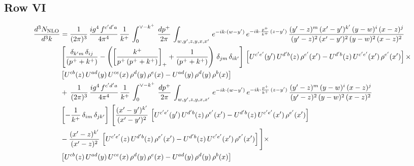 \documentclass[9pt]{article}
\numberwithin{equation}{section}
\begin{document}
\subsection{Row VI}
\begin{align}
   \frac{d^{3}N_{\rm NLO}}{d^{3}k} & = \frac{1}{(2\pi)^{3}}\, \frac{ig^{4}\,f^{c'd'a}}{4\pi^{4}}\, \frac{1}{k^{+}}\,\int_{0}^{\vee - k^{+}}\, \frac{dp^{+}}{2\pi}\, \int_{w,y',z,y,x,x'}\, e^{-ik\cdot (w-y')}\, e^{-ik\cdot \frac{p^{+}}{k^{+}}\,(z-y')}\,\frac{(y'-z)^{m}\,(x'-y')^{k'}\,(y-w)^{i}\,(x-z)^{j}}{(y'-z)^{2}\,(x'-y')^{2}\,(y-w)^{2}\,(x-z)^{2}}\notag \\ & \left[\frac{\delta_{k'm}\,\delta_{ij}}{(p^{+}+k^{+})}-\left(\left[\frac{k^{+}}{p^{+}\,(p^{+}+k^{+})}\right]_{+}+\frac{1}{(p^{+}+k^{+})}\right)\,\delta_{jm}\,\delta_{ik'}\right]\, \left[U^{c'e'}(y')\,U^{d'b}(z)\,\rho^{e'}(x')-U^{d'b}(z)\,U^{c'e'}(x')\,\rho^{e'}(x')\right]\times\notag \\ &  \left[U^{cb}(z)\,U^{ad}(y)\,U^{ce}(x)\,\rho^{d}(y)\,\rho^{e}(x)-U^{ad}(y)\,\rho^{d}(y)\,\rho^{b}(x)\right] \notag \\ & +\,\frac{1}{(2\pi)^{3}}\, \frac{ig^{4}\,f^{c'd'a}}{4\pi^{4}}\, \frac{1}{k^{+}}\,\int_{0}^{\vee - k^{+}}\, \frac{dp^{+}}{2\pi}\, \int_{w,y',z,y,x,x'}\, e^{-ik\cdot (w-y')}\, e^{-ik\cdot \frac{p^{+}}{k^{+}}\,(z-y')}\,\frac{(y'-z)^{m}\,(y-w)^{i}\,(x-z)^{j}}{(y'-z)^{2}\,(y-w)^{2}\,(x-z)^{2}}\notag \\ &  \left[-\frac{1}{k^{+}}\, \delta_{im}\, \delta_{jk'}\right]\, \Bigg[\frac{(x'-y')^{k'}}{(x'-y')^{2}}\,\left[U^{c'e'}(y')\,U^{d'b}(z)\,\rho^{e'}(x')-U^{d'b}(z)\,U^{c'e'}(x')\,\rho^{e'}(x')\right]\notag \\ & -\frac{(x'-z)^{k'}}{(x'-z)^{2}}\,\left[U^{c'e'}(z)\,U^{d'b}(z)\,\rho^{e'}(x')-U^{d'b}(z)\,U^{c'e'}(x')\,\rho^{e'}(x')\right]\Bigg]\times\notag \\ &    \left[U^{cb}(z)\,U^{ad}(y)\,U^{ce}(x)\,\rho^{d}(y)\,\rho^{e}(x)-U^{ad}(y)\,\rho^{d}(y)\,\rho^{b}(x)\right]
\end{align}
\end{document}
